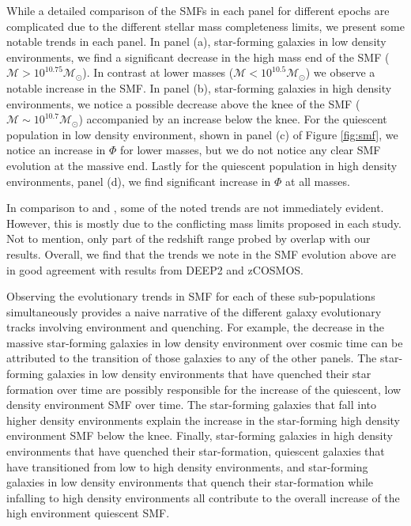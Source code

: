 \documentclass{emulateapj}
\begin{document}
While a detailed comparison of the SMFs in each panel for different epochs are complicated due to the different stellar mass completeness limits, we present some notable trends in each panel. In panel (a), star-forming galaxies in low density environments, we find a significant decrease in the high mass end of the SMF ($\mathcal{M} > 10^{10.75} \mathcal{M}_{\odot}$). In contrast at lower masses ($\mathcal{M} < 10^{10.5} \mathcal{M}_{\odot}$) we observe a notable increase in the SMF. In panel (b), star-forming galaxies in high density environments, we notice a possible decrease above the knee of the SMF ($\mathcal{M} \sim 10^{10.7} \mathcal{M}_{\odot}$) accompanied by an increase below the knee. For the quiescent population in low density environment, shown in panel (c) of Figure \ref{fig:smf}, we notice an increase in $\Phi$ for lower masses, but we do not notice any clear SMF evolution at the massive end. Lastly for the quiescent population in high density environments, panel (d), we find significant increase in $\Phi$ at all masses. 

In comparison to \cite{bundy06a} and \cite{Bolzonella:2010aa}, some of the noted trends are not immediately evident. However, this is mostly due to the conflicting mass limits proposed in each study. Not to mention, only part of the redshift range probed by \cite{bundy06a} overlap with our results. Overall, we find that the trends we note in the SMF evolution above are in good agreement with results from DEEP2 and zCOSMOS. 

Observing the evolutionary trends in SMF for each of these sub-populations simultaneously provides a naive narrative of the different galaxy evolutionary tracks involving environment and quenching. For example, the decrease in the massive star-forming galaxies in low density environment over cosmic time can be attributed to the transition of those galaxies to any of the other panels. The star-forming galaxies in low density environments that have quenched their star formation over time are possibly responsible for the increase of the quiescent, low density environment SMF over time. The star-forming galaxies that fall into higher density environments explain the increase in the star-forming high density environment SMF below the knee. Finally, star-forming galaxies in high density environments that have quenched their star-formation, quiescent galaxies that have transitioned from low to high density environments, and star-forming galaxies in low density environments that quench their star-formation while infalling to high density environments all contribute to the overall increase of the high environment quiescent SMF.
\end{document}
